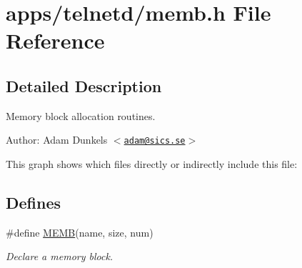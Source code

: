 \hypertarget{a00044}{
\section{apps/telnetd/memb.h File Reference}
\label{a00044}
}


\subsection{Detailed Description}
Memory block allocation routines. 

\begin{Desc}
\item[Author:]Adam Dunkels $<$\href{mailto:adam@sics.se}{\tt adam@sics.se}$>$ \end{Desc}




This graph shows which files directly or indirectly include this file:\subsection*{Defines}
\begin{CompactItemize}
\item 
\#define \hyperlink{a00060_g8457539d6a6eaecded820f4042b8314a}{MEMB}(name, size, num)
\begin{CompactList}\small\item\em Declare a memory block. \item\end{CompactList}\end{CompactItemize}
